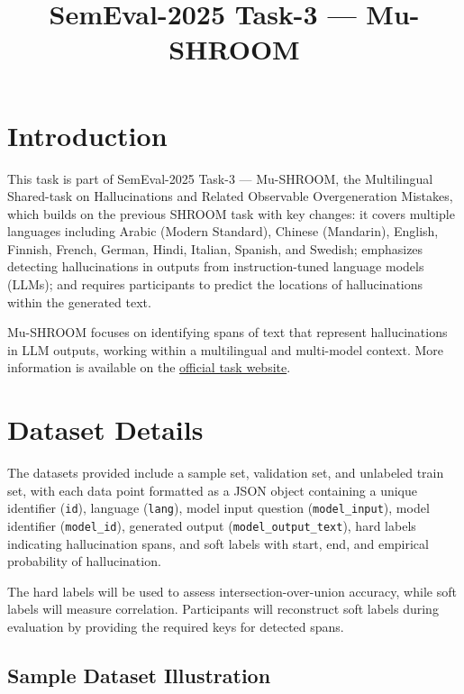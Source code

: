 \documentclass{article}
\title{SemEval-2025 Task-3 — Mu-SHROOM}
\author{}
\date{}
\begin{document}
\maketitle

\section{Introduction}

This task is part of SemEval-2025 Task-3 — Mu-SHROOM, the Multilingual Shared-task on Hallucinations and Related Observable Overgeneration Mistakes, which builds on the previous SHROOM task with key changes: it covers multiple languages including Arabic (Modern Standard), Chinese (Mandarin), English, Finnish, French, German, Hindi, Italian, Spanish, and Swedish; emphasizes detecting hallucinations in outputs from instruction-tuned language models (LLMs); and requires participants to predict the locations of hallucinations within the generated text. 

Mu-SHROOM focuses on identifying spans of text that represent hallucinations in LLM outputs, working within a multilingual and multi-model context. More information is available on the \href{https://helsinki-nlp.github.io/shroom/}{official task website}.

\section{Dataset Details}

The datasets provided include a sample set, validation set, and unlabeled train set, with each data point formatted as a JSON object containing a unique identifier (\texttt{id}), language (\texttt{lang}), model input question (\texttt{model\_input}), model identifier (\texttt{model\_id}), generated output (\texttt{model\_output\_text}), hard labels indicating hallucination spans, and soft labels with start, end, and empirical probability of hallucination.

The hard labels will be used to assess intersection-over-union accuracy, while soft labels will measure correlation. Participants will reconstruct soft labels during evaluation by providing the required keys for detected spans.

\subsection{Sample Dataset Illustration}
\end{document}
